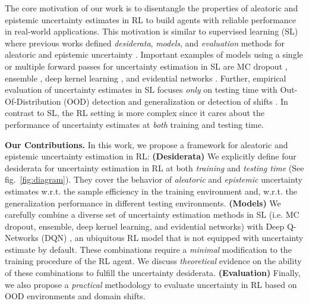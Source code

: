 The core motivation of our work is to disentangle the properties of aleatoric and epistemic uncertainty estimates in RL to build agents with reliable performance in real-world applications. This motivation is similar to supervised learning (SL) where previous works defined \emph{desiderata}, \emph{models}, and \emph{evaluation} methods for aleatoric and epistemic uncertainty \cite{uncertainty-deep-learning, review-uncertainty-dl, dataset-shift, robustness-uncertainty-dirichlet}. Important examples of models using a single or multiple forward passes for uncertainty estimation in SL are MC dropout \cite{dropout}, ensemble \cite{ensembles, hyper-ensembles, batch-ensembles}, deep kernel learning \cite{simple-baseline-uncertainty, due, duq, uceloss}, and evidential networks \cite{postnet, priornet, natpn, evidential-regression}. Further, empirical evaluation of uncertainty estimates in SL focuses \emph{only} on testing time with Out-Of-Distribution (OOD) detection and generalization or detection of shifts \citep{dataset-shift, shifts-dataset}. In contrast to SL, the RL setting is more complex since it cares about the performance of uncertainty estimates at \emph{both} training and testing time.

\textbf{Our Contributions.} In this work, we propose a framework for aleatoric and epistemic uncertainty estimation in RL: \textbf{(Desiderata)} We explicitly define four desiderata for uncertainty estimation in RL at both \emph{training} and \emph{testing time} (See fig.~\ref{fig:diagram}). They cover the behavior of \emph{aleatoric} and \emph{epistemic} uncertainty estimates w.r.t. the sample efficiency in the training environment and, w.r.t. the generalization performance in different testing environments. \textbf{(Models)} We carefully combine a diverse set of uncertainty estimation methods in SL (i.e. MC dropout, ensemble, deep kernel learning, and evidential networks) with Deep Q-Networks (DQN) \cite{dqn}, an ubiquitous RL model that is not equipped with uncertainty estimate by default. These combinations require a \emph{minimal} modification to the training procedure of the RL agent. We discuss \emph{theoretical} evidence on the ability of these combinations to fulfill the uncertainty desiderata. \textbf{(Evaluation)} Finally, we also propose a \emph{practical} methodology to evaluate uncertainty in RL based on OOD environments and domain shifts.
